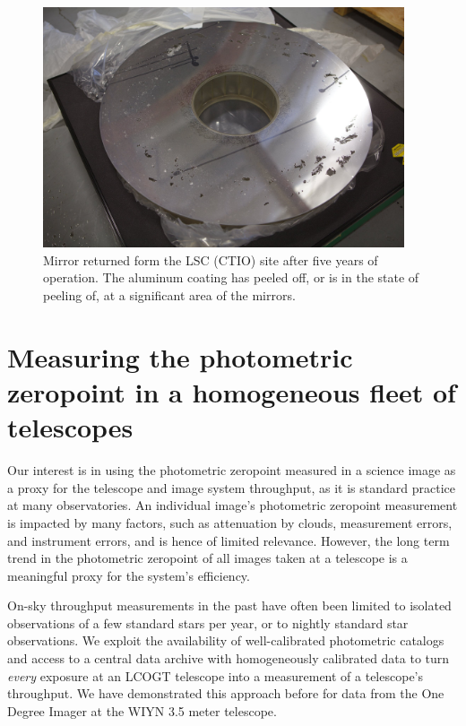 \documentclass[]{spieman}
\begin{document}
\begin{figure}
\includegraphics[width=0.95\textwidth]{images/IMG_4848.jpeg}
\caption{\label{fig_mirrorpeel} Mirror returned form the LSC (CTIO) site after five years of
operation. The aluminum coating has peeled off, or is in the state of peeling of, at a significant
area of the mirrors. }
\end{figure}


\section{Measuring the photometric zeropoint in a homogeneous fleet of telescopes}


Our interest is in using the photometric zeropoint measured in a science image as a proxy for the
telescope and image system throughput, as it is standard practice at many observatories. An
individual image's photometric zeropoint measurement is impacted by many factors, such as
attenuation by clouds, measurement errors, and instrument errors, and is hence of limited relevance.
However, the long term trend in the photometric zeropoint of all images taken at a telescope is a
meaningful proxy for the system's efficiency.

On-sky throughput measurements in the past have often been limited to isolated observations of a few
standard stars per year\cite{benn2000}, or to nightly standard star observations\cite{hopp2008}. We
exploit the availability of well-calibrated photometric catalogs and access to a central
data archive with homogeneously calibrated data to turn {\em every} exposure at an LCOGT telescope
into a measurement of a telescope's throughput. We have demonstrated this approach before for data
from the One Degree Imager at the WIYN 3.5 meter telescope\cite{harbeck2014}.
\end{document}
